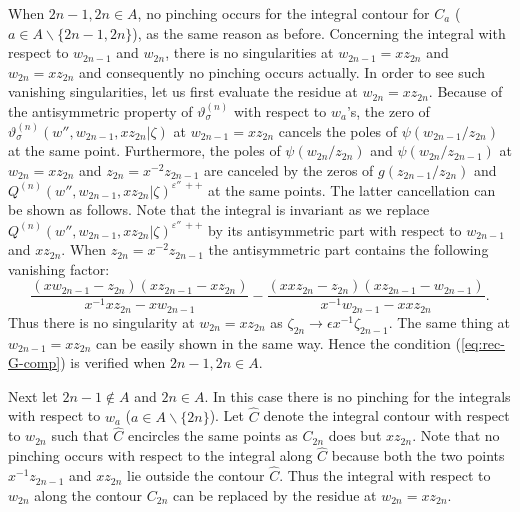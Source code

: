 \documentclass[a4paper,10pt]{article}
\begin{document}
When $2n-1, 2n\in A$, no pinching occurs for the 
integral contour for $C_a$ ($a\in A\backslash 
\{ 2n-1, 2n\}$), as the same reason as before. 
Concerning the integral with respect to $w_{2n-1}$ 
and $w_{2n}$, there is no singularities 
at $w_{2n-1}=xz_{2n}$ and $w_{2n}=xz_{2n}$ and 
consequently no pinching occurs actually. 
In order to see such vanishing singularities, 
let us first evaluate the residue at $w_{2n}=xz_{2n}$. 
Because of the antisymmetric property of 
$\vartheta^{(n)}_\sigma$ with respect to $w_a$'s, 
the zero of 
$\vartheta^{(n)}_\sigma (w'', w_{2n-1}, xz_{2n}|\zeta )$ 
at $w_{2n-1}=xz_{2n}$ cancels the poles of 
$\psi (w_{2n-1}/z_{2n})$ at the same point. 
Furthermore, the poles of $\psi (w_{2n}/z_{2n})$ 
and $\psi (w_{2n}/z_{2n-1})$ at $w_{2n}=xz_{2n}$ 
and $z_{2n}=x^{-2}z_{2n-1}$ are canceled by 
the zeros of $g(z_{2n-1}/z_{2n})$ and 
$Q^{(n)}(w'', w_{2n-1}, xz_{2n}|\zeta )^{\varepsilon''\,++}$ 
at the same points. The latter cancellation can be shown 
as follows. 
Note that the integral is invariant as we replace 
$Q^{(n)}(w'', w_{2n-1}, xz_{2n}|\zeta )^{
\varepsilon''\,++}$ 
by its antisymmetric part with respect to 
$w_{2n-1}$ and $xz_{2n}$. When $z_{2n}=x^{-2}z_{2n-1}$ 
the antisymmetric part contains the following 
vanishing factor: 
$$
\frac{(xw_{2n-1}-z_{2n})(xz_{2n-1}-xz_{2n})}
{x^{-1}xz_{2n}-xw_{2n-1}}-
\frac{(xxz_{2n}-z_{2n})(xz_{2n-1}-w_{2n-1})}
{x^{-1}w_{2n-1}-xxz_{2n}}. 
$$
Thus there is no singularity at $w_{2n}=xz_{2n}$ as 
$\zeta_{2n}\rightarrow \epsilon x^{-1}\zeta_{2n-1}$. 
The same thing at $w_{2n-1}=xz_{2n}$ can be easily shown 
in the same way. Hence the condition (\ref{eq:rec-G-comp}) 
is verified when $2n-1, 2n\in A$. 

Next let $2n-1 \not\in A$ and $2n \in A$. 
In this case there is no pinching for the integrals 
with respect to $w_a$ ($a\in A\backslash \{ 2n \}$). 
Let $\widehat{C}$ denote the integral contour with 
respect to $w_{2n}$ such that $\widehat{C}$ encircles 
the same points as $C_{2n}$ does but $xz_{2n}$. Note that 
no pinching occurs with respect to the integral along 
$\widehat{C}$ because both the two points $x^{-1}z_{2n-1}$ 
and $xz_{2n}$ lie outside the contour $\widehat{C}$. 
Thus the integral with respect to $w_{2n}$ along 
the contour $C_{2n}$ can be replaced by the 
residue at $w_{2n}=xz_{2n}$. 
\end{document}
